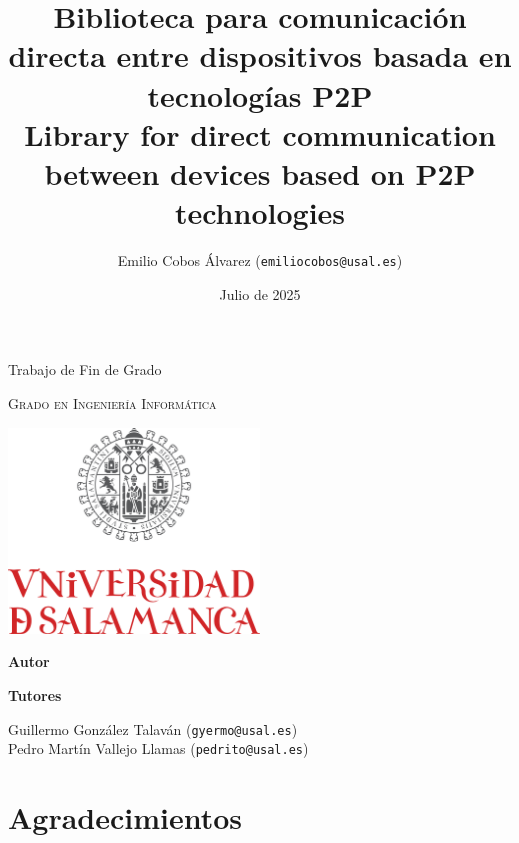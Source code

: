 \documentclass[12pt,a4paper]{report}
\title{
  \textbf{Biblioteca para comunicación directa entre dispositivos basada en tecnologías P2P} \\
  \vspace{\parskip}
  \small Library for direct communication between devices based on P2P technologies
}
\author{
  Emilio Cobos Álvarez (\texttt{emiliocobos@usal.es})
}
\date{Julio de 2025}
\begin{document}
 

\begin{titlepage}
\begin{center}
  {\Large \thetitle}

  \vspace*{\fill}

  {\large Trabajo de Fin de Grado}

  \textsc{Grado en Ingeniería Informática}

  \vspace{2em}

  \includegraphics[width=0.5\textwidth]{res/usal-logo.pdf}

  \vspace{2em}

  \thedate

  \vspace*{\fill}

  {\large \textbf{Autor}}

  \theauthor

  \vspace{\parskip}

  {\large \textbf{Tutores}}

  Guillermo González Talaván (\texttt{gyermo@usal.es}) \\ Pedro Martín Vallejo Llamas (\texttt{pedrito@usal.es})
\end{center}
\end{titlepage}




\clearpage



\clearpage

\printglossaries

\clearpage

\section*{Agradecimientos}
\end{document}
